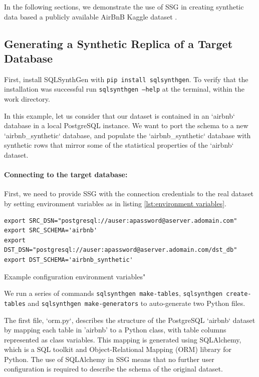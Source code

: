\documentclass[11pt]{article}
\begin{document}
In the following sections, we demonstrate the use of SSG in creating synthetic data based a publicly available AirBnB Kaggle dataset \cite{airbnb}.

\subsection{Generating a Synthetic Replica of a Target Database}

 First, install SQLSynthGen with \texttt{pip install sqlsynthgen}. To verify that the installation was successful run \texttt{sqlsynthgen --help} at the terminal, within the work directory. 

In this example, let us consider that our dataset is contained in an `airbnb` database in a local PostgreSQL instance. We want to port the schema to a new `airbnb\_synthetic` database, and populate the `airbnb\_synthetic` database with synthetic rows that mirror some of the statistical properties of the `airbnb` dataset.

\paragraph{Connecting to the target database:}
First, we need to provide SSG with the connection credentials to the real dataset by setting environment variables as in listing \ref{lst:environment variables}.

\begin{listing}[H]
\begin{verbatim}
export SRC_DSN="postgresql://auser:apassword@aserver.adomain.com"
export SRC_SCHEMA='airbnb'
export DST_DSN="postgresql://auser:apassword@aserver.adomain.com/dst_db"
export DST_SCHEMA='airbnb_synthetic'
\end{verbatim}
\caption{Example configuration environment variables"}
\label{lst:environment variables}
\end{listing}

We run a series of commands \texttt{sqlsynthgen make-tables}, \texttt{sqlsynthgen create-tables} and \texttt{sqlsynthgen make-generators} to auto-generate two Python files. 

The first file, `orm.py`, describes the structure of the PostgreSQL `airbnb` dataset by mapping each table in 'airbnb' to a Python class, with table columns represented as class variables. This mapping is generated using SQLAlchemy\cite{sqlalchemy}, which is a SQL toolkit and Object-Relational Mapping (ORM) library for Python. The use of SQLAlchemy in SSG means that no further user configuration is required to describe the schema of the original dataset. 
\end{document}
